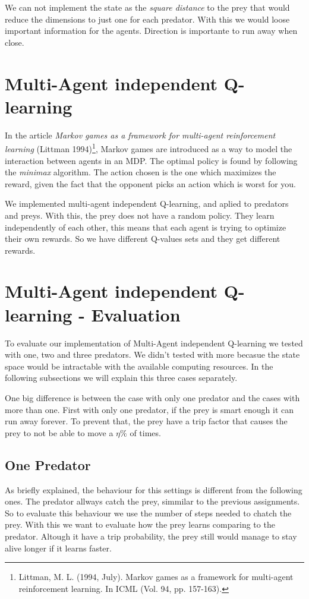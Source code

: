 \documentclass{article}
\begin{document}
We can not implement the state as the \emph{square distance} to the prey that
would reduce the dimensions to just one for each predator. With this we would
loose important information for the agents. Direction is importante to run away
when close.

\section{Multi-Agent independent Q-learning}
In the article \emph{Markov games as a framework for multi-agent reinforcement learning} (Littman 1994)\footnote{Littman, M. L. (1994, July). Markov games as a framework for multi-agent reinforcement learning. In ICML (Vol. 94, pp. 157-163).}, Markov games are introduced as a way to model the interaction between agents in an MDP. The optimal policy is found by following the \emph{minimax} algorithm. The action chosen is the one which maximizes the reward, given the fact that the opponent picks an action which is worst for you.

We implemented multi-agent independent Q-learning, and aplied to predators and
preys. With this, the prey does not have a random policy. They learn
independently of each other, this means that each agent is trying to optimize
their own rewards. So we have different Q-values sets and they get different
rewards.

\section{Multi-Agent independent Q-learning - Evaluation}
To evaluate our implementation of Multi-Agent independent Q-learning we tested
with one, two and three predators. We didn't tested with more becasue the state
space would be intractable with the available computing resources. In the
following subsections we will explain this three cases separately.

One big difference is between the case with only one predator and the cases with
more than one. First with only one predator, if the prey is smart enough it can
run away forever. To prevent that, the prey have a trip factor that causes the
prey to not be able to move a $\eta\%$ of times.

\subsection{One Predator}
As briefly explained, the behaviour for this settings is different from the
following ones. The predator allways catch the prey, simmilar to the previous
assignments. So to evaluate this behaviour we use the number of steps needed to
chatch the prey. With this we want to evaluate how the prey learns comparing to
the predator. Altough it have a trip probability, the prey still would manage to
stay alive longer if it learns faster.
\end{document}
